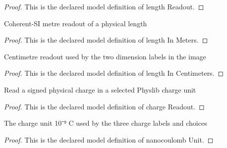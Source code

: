 \begin{proof}
  This is the declared model definition of length Readout.
\end{proof}
\begin{definition}
  \label{def:physics:phyx-mini-0860:phyxminiproblems-problemphyxmini0860-lengthinmeters}
  Coherent-SI metre readout of a physical length
\end{definition}
\begin{proof}
  This is the declared model definition of length In Meters.
\end{proof}
\begin{definition}
  \label{def:physics:phyx-mini-0860:phyxminiproblems-problemphyxmini0860-lengthincentimeters}
  Centimetre readout used by the two dimension labels in the image
\end{definition}
\begin{proof}
  This is the declared model definition of length In Centimeters.
\end{proof}
\begin{definition}
  \label{def:physics:phyx-mini-0860:phyxminiproblems-problemphyxmini0860-chargereadout}
  Read a signed physical charge in a selected Physlib charge unit
\end{definition}
\begin{proof}
  This is the declared model definition of charge Readout.
\end{proof}
\begin{definition}
  \label{def:physics:phyx-mini-0860:phyxminiproblems-problemphyxmini0860-nanocoulombunit}
  The charge unit 10⁻⁹ C used by the three charge labels and choices
\end{definition}
\begin{proof}
  This is the declared model definition of nanocoulomb Unit.
\end{proof}
